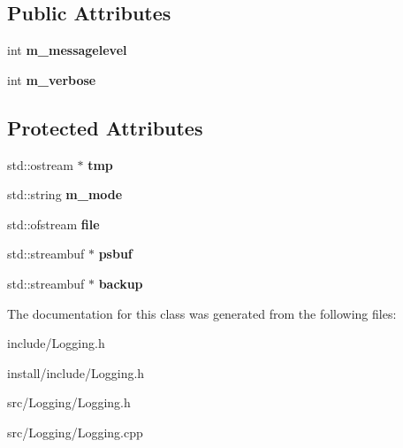 \subsection*{Public Attributes}
\begin{DoxyCompactItemize}
\item 
\hypertarget{classLogging_1_1MyStreamBuf_aadb5677582e31b1c7994c2cfa355edba}{int {\bfseries m\-\_\-messagelevel}}\label{classLogging_1_1MyStreamBuf_aadb5677582e31b1c7994c2cfa355edba}

\item 
\hypertarget{classLogging_1_1MyStreamBuf_afa47f8ca7e37b4408fdab52912e29c77}{int {\bfseries m\-\_\-verbose}}\label{classLogging_1_1MyStreamBuf_afa47f8ca7e37b4408fdab52912e29c77}

\end{DoxyCompactItemize}
\subsection*{Protected Attributes}
\begin{DoxyCompactItemize}
\item 
\hypertarget{classLogging_1_1MyStreamBuf_afa098901af4ff3f768fdc64850b464f5}{std\-::ostream $\ast$ {\bfseries tmp}}\label{classLogging_1_1MyStreamBuf_afa098901af4ff3f768fdc64850b464f5}

\item 
\hypertarget{classLogging_1_1MyStreamBuf_a4e11f05cc94cffb398bf51395f251b90}{std\-::string {\bfseries m\-\_\-mode}}\label{classLogging_1_1MyStreamBuf_a4e11f05cc94cffb398bf51395f251b90}

\item 
\hypertarget{classLogging_1_1MyStreamBuf_a47035c3dec1a0082191b06275195ce57}{std\-::ofstream {\bfseries file}}\label{classLogging_1_1MyStreamBuf_a47035c3dec1a0082191b06275195ce57}

\item 
\hypertarget{classLogging_1_1MyStreamBuf_aa987874aab0a38a608029ebb1bd6229f}{std\-::streambuf $\ast$ {\bfseries psbuf}}\label{classLogging_1_1MyStreamBuf_aa987874aab0a38a608029ebb1bd6229f}

\item 
\hypertarget{classLogging_1_1MyStreamBuf_abecdf6ccab9c410c4396035a8ad48112}{std\-::streambuf $\ast$ {\bfseries backup}}\label{classLogging_1_1MyStreamBuf_abecdf6ccab9c410c4396035a8ad48112}

\end{DoxyCompactItemize}


The documentation for this class was generated from the following files\-:\begin{DoxyCompactItemize}
\item 
include/Logging.\-h\item 
install/include/Logging.\-h\item 
src/\-Logging/Logging.\-h\item 
src/\-Logging/Logging.\-cpp\end{DoxyCompactItemize}
